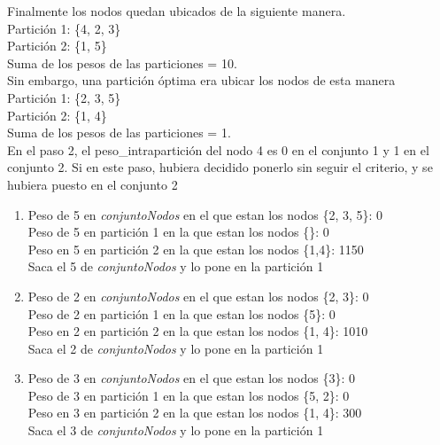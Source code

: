 \documentclass[10pt,a4paper]{article}
\begin{document}
\noindent Finalmente los nodos quedan ubicados de la siguiente manera.\\
Partición 1: \{4, 2, 3\}\\
Partición 2: \{1, 5\}\\
Suma de los pesos de las particiones = 10.\\

\noindent Sin embargo, una partición óptima era ubicar los nodos de esta manera\\
Partición 1: \{2, 3, 5\}\\
Partición 2: \{1, 4\}\\
Suma de los pesos de las particiones = 1.\\

En el paso 2, el peso\_intrapartición del nodo 4 es 0 en el conjunto 1 y 1 en el conjunto 2. Si en este paso, hubiera decidido ponerlo sin seguir el criterio, y se hubiera puesto en el conjunto 2

\begin{enumerate}
\item
Peso de 5 en \textit{conjuntoNodos} en el que estan los nodos \{2, 3, 5\}: 0\\
Peso de 5 en partición 1 en la que estan los nodos \{\}: 0 \\
Peso en 5 en partición 2 en la que estan los nodos \{1,4\}: 1150 \\

Saca el 5 de \textit{conjuntoNodos} y lo pone en la partición 1\\

\item
Peso de 2 en \textit{conjuntoNodos} en el que estan los nodos \{2, 3\}: 0\\
Peso de 2 en partición 1 en la que estan los nodos \{5\}: 0 \\
Peso en 2 en partición 2 en la que estan los nodos \{1, 4\}: 1010 \\

Saca el 2 de \textit{conjuntoNodos} y lo pone en la partición 1\\

\item
Peso de 3 en \textit{conjuntoNodos} en el que estan los nodos \{3\}: 0\\
Peso de 3 en partición 1 en la que estan los nodos \{5, 2\}: 0 \\
Peso en 3 en partición 2 en la que estan los nodos \{1, 4\}: 300 \\

Saca el 3 de \textit{conjuntoNodos} y lo pone en la partición 1\\
\end{enumerate}
\end{document}
